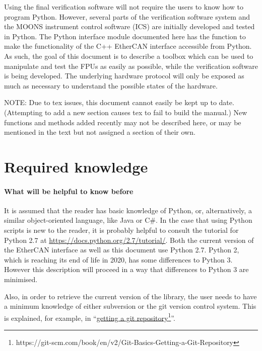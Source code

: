 \documentclass[fontsize=12,a4paper]{scrreprt}
\begin{document}
Using the final verification software will not require the users to
know how to program Python.  However, several parts of the
verification software system and the MOONS instrument control software
(ICS) are initially developed and tested in Python.  The Python
interface module documented here has the function to make the
functionality of the C++ EtherCAN interface accessible from Python. As
such, the goal of this document is to describe a toolbox which can be
used to manipulate and test the FPUs as easily as possible, while the
verification software is being developed. The underlying hardware
protocol will only be exposed as much as necessary to understand the
possible states of the hardware.

NOTE: Due to tex issues, this document cannot easily be kept up to date.
(Attempting to add a new section causes tex to fail to build the manual.)
New functions and methods added recently may not be described here, or
may be mentioned in the text but not assigned a section of their own.

\section{Required knowledge}

\paragraph{What will be helpful to know before}
It is assumed that the reader has basic knowledge of Python, or,
alternatively, a similar object-oriented language, like Java or C\#.
In the case that using Python scripts is new to the reader, it is
probably helpful to consult the tutorial for Python 2.7 at
\url{https://docs.python.org/2.7/tutorial/}.  Both the current version
of the EtherCAN interface as well as this document use Python 2.7. Python 2, which
is reaching its end of life in 2020, has some differences to Python
3. However this description will proceed in a way that differences to
Python 3 are minimised.

  Also, in order to retrieve the current version of the
library, the user needs to have a minimum knowledge of either
subversion or the git version control system. This is explained, for
example, in
``\href{https://git-scm.com/book/en/v2/Git-Basics-Getting-a-Git-Repository}{getting
  a git
  repository}\footnote{https://git-scm.com/book/en/v2/Git-Basics-Getting-a-Git-Repository}''.
\end{document}
